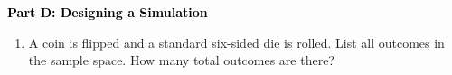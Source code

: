 \documentclass[12pt, letterpaper, fleqn]{article}
\newcommand{\blank}{\underline{\hspace{2.2cm}}}
\begin{document}
\newpage

\begin{tcolorbox}[colback=customteal!20]
\large\textcolor{black}{\textbf{Part D: Designing a Simulation}}
\end{tcolorbox}

\vspace{3mm}

\begin{enumerate}[itemsep=4.2cm, leftmargin=0.6cm, resume]
\item A coin is flipped and a standard six-sided die is rolled. List all outcomes in the sample space. How many total outcomes are there? \blank
\end{enumerate}
\end{document}
